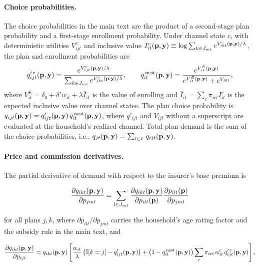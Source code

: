 \documentclass[12pt]{article}
\begin{document}
\paragraph{Choice probabilities.} The choice probabilities in the main text are the product of a second-stage plan probability and a first-stage enrollment probability. Under channel state $c$, with deterministic utilities $V^c_{ijt}$ and inclusive value $I^c_{it}({\bf p},{\bf y}) \equiv \log \sum_{k \in J_{mt}} e^{V^c_{ikt}({\bf p},{\bf y})/\lambda}$, the plan and enrollment probabilities are
\begin{equation}
\label{eqn:app-shares}
q'^{\,c}_{ijt}({\bf p},{\bf y}) = \frac{e^{V^c_{ijt}({\bf p},{\bf y})/\lambda}}{\sum_{k \in J_{mt}} e^{V^c_{ikt}({\bf p},{\bf y})/\lambda}}, \qquad
q^{\,\mathrm{nest}}_{it}({\bf p},{\bf y}) = \frac{e^{V^E_{it}({\bf p},{\bf y})}}{e^{V^E_{it}({\bf p},{\bf y})} + e^{V_{i0t}}},
\end{equation}
where $V^E_{it} = \delta_0 + \delta' w_{it} + \lambda \bar{I}_{it}$ is the value of enrolling and $\bar{I}_{it} = \sum_c \pi_{ict} I^c_{it}$ is the expected inclusive value over channel states. The plan choice probability is $q_{ijt}({\bf p},{\bf y}) = q'_{ijt}({\bf p},{\bf y})\, q^{\,\mathrm{nest}}_{it}({\bf p},{\bf y})$, where $q'_{ijt}$ and $V_{ijt}$ without a superscript are evaluated at the household's realized channel. Total plan demand is the sum of the choice probabilities, i.e.,  $q_{jt}({\bf p},{\bf y}) = \sum_{i \in I} \, q_{ijt}({\bf p},{\bf y})$.

\paragraph{Price and commission derivatives.} The partial derivative of demand with respect to the insurer's base premium is

\begin{equation*}
		\frac{\partial q_{ikt}({\bf p},{\bf y})}{\partial p_{jmt}} = \sum_{l \in J_{mt}} \frac{ \partial q_{ikt}({\bf p},{\bf y})}{\partial p_{ilt}({\bf p})}\frac{ \partial p_{ilt}({\bf p})}{\partial p_{jmt}}
	\end{equation*}

	\noindent for all plans $j,k$, where $\partial p_{ilt}/\partial p_{jmt}$ carries the household's age rating factor and the subsidy rule in the main text, and

\begin{equation*}
		\frac{\partial q_{ikt}({\bf p},{\bf y})}{\partial  p_{ijt}} = q_{ikt}({\bf p},{\bf y}) \left[ \frac{\alpha_{it}}{\lambda}\left( \mathbb{I}[k = j] - q'_{ijt}({\bf p},{\bf y}) \right) + \left(1 - q^{\,\mathrm{nest}}_{it}({\bf p},{\bf y})\right) \sum_c \pi_{ict}\, \alpha^c_{it}\, q'^{\,c}_{ijt}({\bf p},{\bf y}) \right],
\end{equation*}
\end{document}
